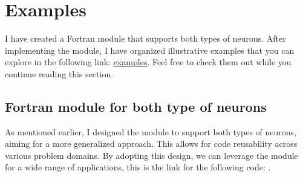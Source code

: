 \section{Examples}
I have created a Fortran module that supports both types of neurons. After implementing the module,
I have organized illustrative examples that you can explore in the following link:
\href{https://github.com/alecksandr26/fortran-ml/tree/main/examples}{examples}.
Feel free to check
them out while you continue reading this section.
\subsection{Fortran module for both type of neurons}
As mentioned earlier, I designed the module to support both types of neurons, aiming for a more generalized
approach. This allows for code reusability across various problem domains. By adopting this design, we can
leverage the module for a wide range of applications, this is the link for the following code:
\hyperrf{}{}.

\begin{lstlisting}

\end{lstlisting}




